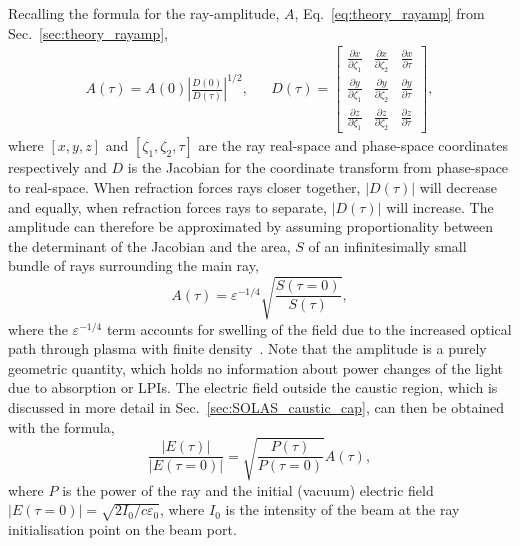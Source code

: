 Recalling the formula for the ray-amplitude, $A$, Eq.~\ref{eq:theory_rayamp} from Sec.~\ref{sec:theory_rayamp},
\begin{align}
    A(\tau) = A(0)\left| \frac{D(0)}{D(\tau)} \right|^{1/2}, &&
    D(\tau) = 
    \begin{bmatrix}
        \frac{\partial x}{\partial \zeta_1} & \frac{\partial x}{\partial \zeta_2} & \frac{\partial x}{\partial \tau} \\
        \frac{\partial y}{\partial \zeta_1} & \frac{\partial y}{\partial \zeta_2} & \frac{\partial y}{\partial \tau} \\
        \frac{\partial z}{\partial \zeta_1} & \frac{\partial z}{\partial \zeta_2} & \frac{\partial z}{\partial \tau}
    \end{bmatrix},
\end{align}
where $[x,y,z]$ and $[\zeta_1,\zeta_2,\tau]$ are the ray real-space and phase-space coordinates respectively and $D$ is the Jacobian for the coordinate transform from phase-space to real-space.
When refraction forces rays closer together, $|D(\tau)|$ will decrease and equally, when refraction forces rays to separate, $|D(\tau)|$ will increase.
The amplitude can therefore be approximated by assuming proportionality between the determinant of the Jacobian and the area, $S$ of an infinitesimally small bundle of rays surrounding the main ray,
\begin{equation}
    A(\tau) = \varepsilon^{-1/4} \sqrt{\frac{S(\tau=0)}{S(\tau)}},
\end{equation}
where the $\varepsilon^{-1/4}$ term accounts for swelling of the field due to the increased optical path through plasma with finite density~\cite{follett_validation_2022}.
Note that the amplitude is a purely geometric quantity, which holds no information about power changes of the light due to absorption or \ac{LPIs}.
The electric field outside the caustic region, which is discussed in more detail in Sec.~\ref{sec:SOLAS_caustic_cap}, can then be obtained with the formula,
\begin{equation}
    \frac{|E(\tau)|}{|E(\tau=0)|} = \sqrt{\frac{P(\tau)}{P(\tau=0)}}A(\tau),
\end{equation}
where $P$ is the power of the ray and the initial (vacuum) electric field $|E(\tau=0)|=\sqrt{2I_0/c \varepsilon_0}$, where $I_0$ is the intensity of the beam at the ray initialisation point on the beam port.

